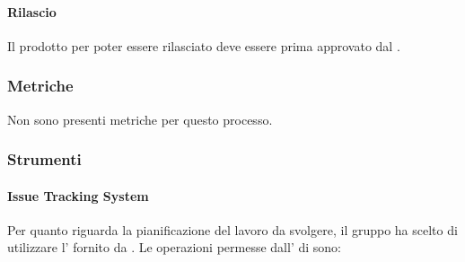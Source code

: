 \paragraph*{Rilascio}
Il prodotto per poter essere rilasciato deve essere prima approvato dal \Responsabile{}.

\subsubsection{Metriche}
Non sono presenti metriche per questo processo.

\subsubsection{Strumenti}

\paragraph{Issue Tracking System}
Per quanto riguarda la pianificazione del lavoro da svolgere, il gruppo \Gruppo{} ha scelto di utilizzare l' fornito da .
Le operazioni permesse dall' di  sono:
